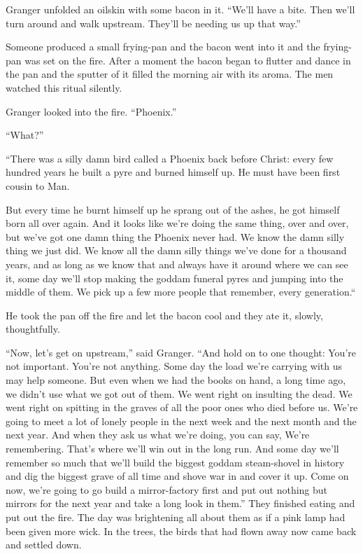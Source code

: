 \documentclass[11pt,openany]{book}
\begin{document}
Granger unfolded an oilskin with some bacon in it. ``We'll have a bite. Then we'll turn around and walk upstream. They'll be needing us up that way.''

Someone produced a small frying-pan and the bacon went into it and the frying-pan was set on the fire. After a moment the bacon began to flutter and dance in the pan and the sputter of it filled the morning air with its aroma. The men watched this ritual silently.

Granger looked into the fire. ``Phoenix.''

``What?''

``There was a silly damn bird called a Phoenix back before Christ: every few hundred years he built a pyre and burned himself up. He must have been first cousin to Man.

But every time he burnt himself up he sprang out of the ashes, he got himself born all over again. And it looks like we're doing the same thing, over and over, but we've got one damn thing the Phoenix never had. We know the damn silly thing we just did. We know all the damn silly things we've done for a thousand years, and as long as we know that and always have it around where we can see it, some day we'll stop making the goddam funeral pyres and jumping into the middle of them. We pick up a few more people that remember, every generation.``

He took the pan off the fire and let the bacon cool and they ate it, slowly, thoughtfully.

``Now, let's get on upstream,'' said Granger. ``And hold on to one thought: You're not important. You're not anything. Some day the load we're carrying with us may help someone. But even when we had the books on hand, a long time ago, we didn't use what we got out of them. We went right on insulting the dead. We went right on spitting in the graves of all the poor ones who died before us. We're going to meet a lot of lonely people in the next week and the next month and the next year. And when they ask us what we're doing, you can say, We're remembering. That's where we'll win out in the long run. And some day we'll remember so much that we'll build the biggest goddam steam-shovel in history and dig the biggest grave of all time and shove war in and cover it up. Come on now, we're going to go build a mirror-factory first and put out nothing but mirrors for the next year and take a long look in them.'' They finished eating and put out the fire. The day was brightening all about them as if a pink lamp had been given more wick. In the trees, the birds that had flown away now came back and settled down.
\end{document}
